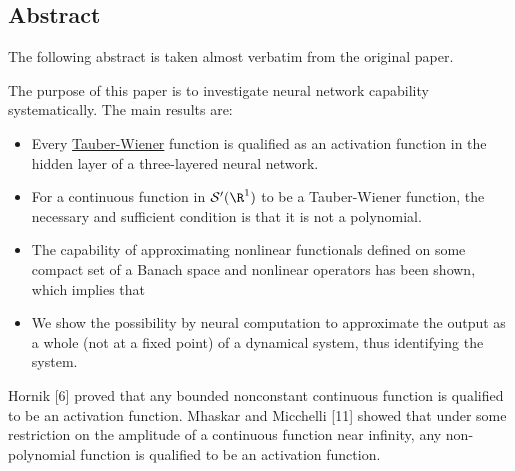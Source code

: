 \subsection{Abstract}\label{a8a8f03}

\label{a216d4b}

The following abstract is taken almost verbatim from the original paper.

The purpose of this paper is to investigate neural network capability
systematically. The main results are:
\begin{itemize}
  \item Every \href{e65fc0e}{Tauber-Wiener} function is qualified as an
        activation function in the hidden layer of a three-layered neural
        network.
  \item For a continuous function in $\mathcal S'(\R^1)$ to be a Tauber-Wiener
        function, the necessary and sufficient condition is that it is not a
        polynomial.
  \item The capability of approximating nonlinear functionals defined on some
        compact set of a Banach space and nonlinear operators has been shown,
        which implies that
  \item We show the possibility by neural computation to approximate the output
        as a whole (not at a fixed point) of a dynamical system, thus
        identifying the system.
\end{itemize}

\label{d4a14c6}

Hornik [6] proved that any bounded nonconstant continuous function is qualified
to be an activation function. Mhaskar and Micchelli [11] showed that under some
restriction on the amplitude of a continuous function near infinity, any
non-polynomial function is qualified to be an activation function.
